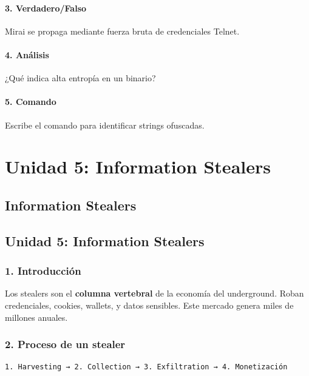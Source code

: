 \documentclass[
  letterpaper,
]{report}
\begin{document}
\subsection{3. Verdadero/Falso}\label{verdaderofalso-2}

Mirai se propaga mediante fuerza bruta de credenciales Telnet.

\subsection{4. Análisis}\label{anuxe1lisis-2}

¿Qué indica alta entropía en un binario?

\subsection{5. Comando}\label{comando-2}

Escribe el comando para identificar strings ofuscadas.

\part{Unidad 5: Information Stealers}

\chapter{Information Stealers}\label{information-stealers}

\chapter{Unidad 5: Information
Stealers}\label{unidad-5-information-stealers-1}

\section{1. Introducción}\label{introducciuxf3n-4}

Los stealers son el \textbf{columna vertebral} de la economía del
underground. Roban credenciales, cookies, wallets, y datos sensibles.
Este mercado genera miles de millones anuales.

\section{2. Proceso de un stealer}\label{proceso-de-un-stealer}

\begin{verbatim}
1. Harvesting → 2. Collection → 3. Exfiltration → 4. Monetización
\end{verbatim}
\end{document}
